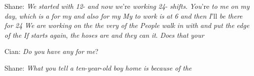\begin{lessonbody}
Shane: \textit{We} \textit{started} \textit{with} \textit{12}-  \textit{and} \textit{now} \textit{we}’re \textit{working}  \textit{24}- \textit{shifts}. \textit{You}’re  \textit{to} \textit{me} \textit{on} \textit{my}  \textit{day}, \textit{which} \textit{is} \textit{a}  \textit{for} \textit{my}  \textit{and} \textit{also} \textit{for} \textit{my}  \textit{My}  \textit{to} \textit{work} \textit{is} \textit{at} \textit{6}   \textit{and} \textit{then} \textit{I}’ll \textit{be} \textit{there} \textit{for}  \textit{24}  \textit{We} \textit{are} \textit{working}  \textit{on} \textit{the}   \textit{the} \textit{very}  \textit{of} \textit{the}  
\textit{People} \textit{walk} \textit{in} \textit{with}  \textit{and} \textit{put}   \textit{the}  \textit{edge} \textit{of} \textit{the}  \textit{If}  \textit{starts} \textit{again}, \textit{the} \textit{hoses} \textit{are}   \textit{and} \textit{they} \textit{can}  \textit{it}. \textit{Does} \textit{that}  \textit{your}  

Cian:  \textit{Do} \textit{you} \textit{have} \textit{any}  \textit{for} \textit{me}?

Shane: \textit{What}  \textit{you} \textit{tell} \textit{a} \textit{ten}-\textit{year}-\textit{old} \textit{boy}  \textit{home} \textit{is}  \textit{because} \textit{of} \textit{the} 


\end{lessonbody}
